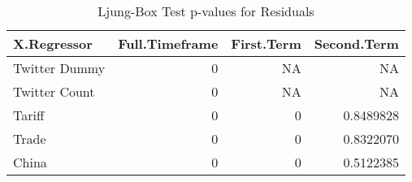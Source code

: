 \begin{table}

\caption{Ljung-Box Test p-values for Residuals}
\centering
\begin{tabular}[t]{l|r|r|r}
\hline
X.Regressor & Full.Timeframe & First.Term & Second.Term\\
\hline
Twitter Dummy & 0 & NA & NA\\
\hline
Twitter Count & 0 & NA & NA\\
\hline
Tariff & 0 & 0 & 0.8489828\\
\hline
Trade & 0 & 0 & 0.8322070\\
\hline
China & 0 & 0 & 0.5122385\\
\hline
\end{tabular}
\end{table}
